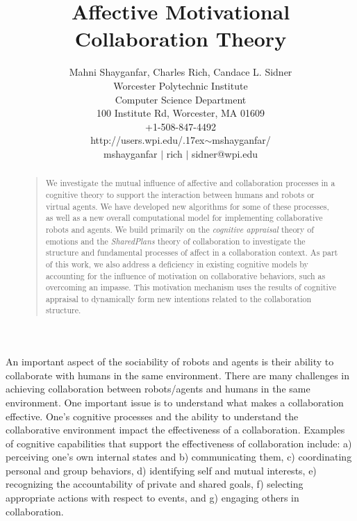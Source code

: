 \documentclass[letterpaper]{article}
\begin{document}
%
\title{Affective Motivational Collaboration Theory}
\author{Mahni Shayganfar, Charles Rich, Candace L. Sidner\\
Worcester Polytechnic Institute\\
Computer Science Department\\
100 Institute Rd, Worcester, MA 01609\\
+1-508-847-4492\\
http://users.wpi.edu/{\raise.17ex\hbox{$\scriptstyle\sim$}}mshayganfar/\\
mshayganfar $|$ rich $|$ sidner@wpi.edu\\
}
\maketitle
\begin{abstract}
\begin{quote}
We investigate the mutual influence of affective and collaboration processes in
a cognitive theory to support the interaction between humans and robots or
virtual agents. We have developed new algorithms for some of these processes, as
well as a new overall computational model for implementing collaborative robots
and agents. We build primarily on the \textit{cognitive appraisal} theory of
emotions and the \textit{SharedPlans} theory of collaboration to investigate the
structure and fundamental processes of affect in a collaboration context. As
part of this work, we also address a deficiency in existing cognitive models by
accounting for the influence of motivation on collaborative behaviors, such as
overcoming an impasse. This motivation mechanism uses the results of cognitive
appraisal to dynamically form new intentions related to the collaboration
structure.
\end{quote}
\end{abstract}

\vspace*{-1mm}
An important aspect of the sociability of robots and agents is their ability to
collaborate with humans in the same environment. There are many challenges in
achieving collaboration between robots/agents and humans in the same
environment. One important issue is to understand what makes a collaboration
effective. One's cognitive processes and the ability to understand the
collaborative environment impact the effectiveness of a collaboration. Examples
of cognitive capabilities that support the effectiveness of collaboration
include: a) perceiving one's own internal states and b) communicating them, c)
coordinating personal and group behaviors, d) identifying self and mutual
interests, e) recognizing the accountability of private and shared goals, f)
selecting appropriate actions with respect to events, and g) engaging others in
collaboration.
\end{document}
